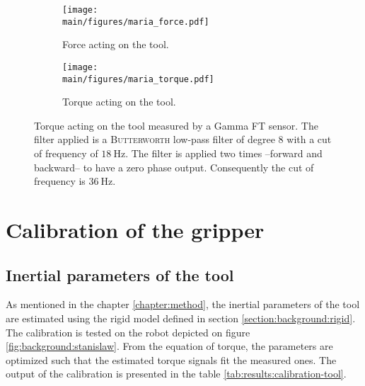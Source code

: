 \documentclass[/home/francois/latex/report/main.tex]{subfiles}
\begin{document}
\begin{figure}[h]
\centering
\begin{subfigure}{0.6\textwidth}
\centering
\texttt{[image: \\main/figures/maria\_force.pdf]}
\caption{Force acting on the tool.}
\label{fig:results:force}
\end{subfigure}
\begin{subfigure}{0.6\textwidth}
\centering
\texttt{[image: \\main/figures/maria\_torque.pdf]}
\caption{Torque acting on the tool.}
\label{fig:results:torque}
\end{subfigure}
\caption{Torque acting on the tool measured by a Gamma \ac{FT} sensor. The  filter applied is a \textsc{Butterworth} low-pass filter of degree 8 with a cut of frequency of $18 \ \si{\hertz}$. The filter is applied two times –forward and backward– to have a zero phase output. Consequently the cut of frequency is $36 \ \si{\hertz}$. \label{fig:results:force-torque}}
\end{figure}

\section{Calibration of the gripper}
\label{section:results:calibration}

\subsection{Inertial parameters of the tool}

As mentioned in the chapter \ref{chapter:method}, the inertial parameters of the tool are estimated using the rigid model defined in section \ref{section:background:rigid}. The calibration is tested on the robot depicted on figure \ref{fig:background:stanislaw}. From the equation of torque, the parameters are optimized such that the estimated torque signals fit the measured ones. The output of the calibration is presented in the table \ref{tab:results:calibration-tool}.
\end{document}
